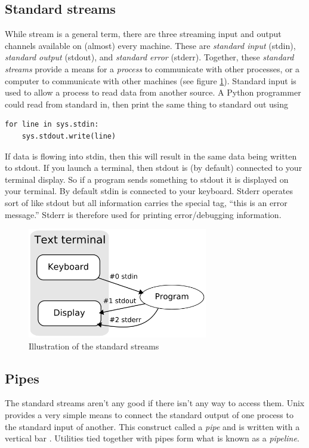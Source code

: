 \subsection{Standard streams}
While stream is a general term, there are three streaming input and output channels available on (almost) every machine.  These are \emph{standard input} (stdin), \emph{standard output} (stdout), and \emph{standard error} (stderr).  Together, these \emph{standard streams} provide a means for a \emph{process} to communicate with other processes, or a computer to communicate with other machines (see figure \ref{unix:fig:stdstreams}).  Standard input is used to allow a process to read data from another source.  A Python programmer could read from standard in, then print the same thing to standard out using
\begin{verbatim}
for line in sys.stdin:
    sys.stdout.write(line)
\end{verbatim}
If data is flowing into stdin, then this will result in the same data being written to stdout.  If you launch a terminal, then stdout is (by default) connected to your terminal display.  So if a program sends something to stdout it is displayed on your terminal.  By default stdin is connected to your keyboard.  Stderr operates sort of like stdout but all information carries the special tag, ``this is an error message.''  Stderr is therefore used for printing error/debugging information.
\begin{figure}
  \label{unix:fig:stdstreams}
  \includegraphics[width=0.7\textwidth]{../images/Stdstreams-notitle}
  \caption{Illustration of the standard streams}
\end{figure}


\subsection{Pipes}
\label{subsection:pipes}
The standard streams aren't any good if there isn't any way to access them.  Unix provides a very simple means to connect the standard output of one process to the standard input of another.  This construct called a \emph{pipe} and is written with a vertical bar \T{|}.  Utilities tied together with pipes form what is known as a \emph{pipeline}.

